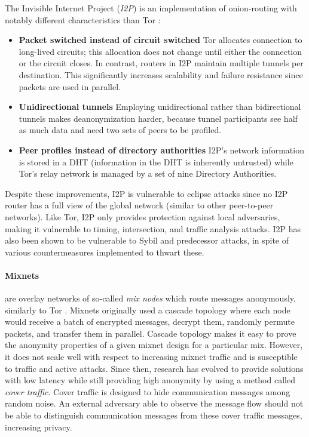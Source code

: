 The Invisible Internet Project (\textit{I2P}) is an implementation of onion-routing with notably different characteristics than Tor \cite{i2p}:

\begin{itemize}

    \item \textbf{Packet switched instead of circuit switched}
          Tor allocates connection to long-lived circuits; this allocation does not change until either the connection or the circuit closes. In contrast, routers in I2P maintain multiple tunnels per destination. This significantly increases scalability and failure resistance since packets are used in parallel.

    \item \textbf{Unidirectional tunnels}
          Employing unidirectional rather than bidirectional tunnels makes deanonymization harder, because tunnel participants see half as much data and need two sets of peers to be profiled.

    \item \textbf{Peer profiles instead of directory authorities}
          I2P’s network information is stored in a DHT (information in the DHT is inherently untrusted) while Tor’s relay network is managed by a set of nine Directory Authorities.
\end{itemize}

Despite these improvements, I2P is vulnerable to eclipse attacks since no I2P router has a full view of the global network (similar to other peer-to-peer networks). Like Tor, I2P only provides protection against local adversaries, making it vulnerable to timing, intersection, and traffic analysis attacks. I2P has also been shown to be vulnerable to Sybil and predecessor attacks, in spite of various countermeasures implemented to thwart these.

\paragraph{Mixnets} are overlay networks of so-called \textit{mix nodes} which route messages anonymously, similarly to Tor \cite{mixnets}. Mixnets originally used a cascade topology where each node would receive a batch of encrypted messages, decrypt them, randomly permute packets, and transfer them in parallel. Cascade topology makes it easy to prove the anonymity properties of a given mixnet design for a particular mix. However, it does not scale well with respect to increasing mixnet traffic and is susceptible to traffic and active attacks. Since then, research has evolved to provide solutions with low latency while still providing high anonymity by using a method called \textit{cover traffic}. Cover traffic is designed to hide communication messages among random noise. An external adversary able to observe the message flow should not be able to
distinguish communication messages from these cover traffic messages, increasing privacy.

